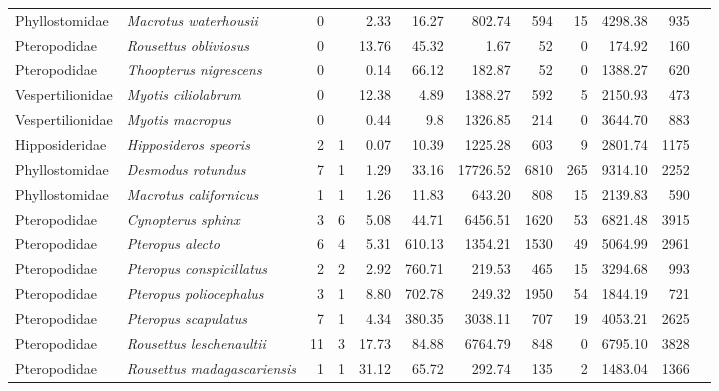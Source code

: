 \begin{landscape}
\begin{longtable}{@{}llrrrrrrrrrl@{}}
  Phyllostomidae & \emph{Macrotus waterhousii} & 0 &  & 2.33 & 16.27 & 802.74 & 594 & 15 & 4298.38 & 935 & \cite{burns2014correlates} \\ 
  Pteropodidae & \emph{Rousettus obliviosus} & 0 &  & 13.76 & 45.32 & 1.67 & 52 & 0 & 174.92 & 160 & \cite{goodman2010phylogeny} \\ 
  Pteropodidae & \emph{Thoopterus nigrescens} & 0 &  & 0.14 & 66.12 & 182.87 & 52 & 0 & 1388.27 & 620 & \cite{burns2014correlates} \\ 
  Vespertilionidae & \emph{Myotis ciliolabrum} & 0 &  & 12.38 & 4.89 & 1388.27 & 592 & 5 & 2150.93 & 473 & \cite{burns2014correlates} \\ 
  Vespertilionidae & \emph{Myotis macropus} & 0 &  & 0.44 & 9.8 & 1326.85 & 214 & 0 & 3644.70 & 883 & \cite{burns2014correlates} \\ 
  Hipposideridae & \emph{Hipposideros speoris} & 2 & 1 & 0.07 & 10.39 & 1225.28 & 603 & 9 & 2801.74 & 1175 & \cite{chinnasamy2013genetic} \\ 
  Phyllostomidae & \emph{Desmodus rotundus} & 7 & 1 & 1.29 & 33.16 & 17726.52 & 6810 & 265 & 9314.10 & 2252 & \cite{burns2014correlates} \\ 
  Phyllostomidae & \emph{Macrotus californicus} & 1 & 1 & 1.26 & 11.83 & 643.20 & 808 & 15 & 2139.83 & 590 & \cite{burns2014correlates} \\ 
  Pteropodidae & \emph{Cynopterus sphinx} & 3 & 6 & 5.08 & 44.71 & 6456.51 & 1620 & 53 & 6821.48 & 3915 & \cite{burns2014correlates} \\ 
  Pteropodidae & \emph{Pteropus alecto} & 6 & 4 & 5.31 & 610.13 & 1354.21 & 1530 & 49 & 5064.99 & 2961 & \cite{webb1996mobility} \\ 
  Pteropodidae & \emph{Pteropus conspicillatus} & 2 & 2 & 2.92 & 760.71 & 219.53 & 465 & 15 & 3294.68 & 993 & \cite{fox2006population} \\ 
  Pteropodidae & \emph{Pteropus poliocephalus} & 3 & 1 & 8.80 & 702.78 & 249.32 & 1950 & 54 & 1844.19 & 721 & \cite{webb1996mobility} \\ 
  Pteropodidae & \emph{Pteropus scapulatus} & 7 & 1 & 4.34 & 380.35 & 3038.11 & 707 & 19 & 4053.21 & 2625 & \cite{burns2014correlates} \\ 
  Pteropodidae & \emph{Rousettus leschenaultii} & 11 & 3 & 17.73 & 84.88 & 6764.79 & 848 & 0 & 6795.10 & 3828 & \cite{burns2014correlates} \\ 
  Pteropodidae & \emph{Rousettus madagascariensis} & 1 & 1 & 31.12 & 65.72 & 292.74 & 135 & 2 & 1483.04 & 1366 & \cite{burns2014correlates} \\ 

\end{longtable}
\end{landscape}

